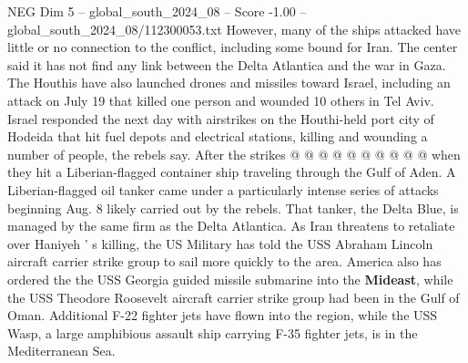 \begin{textsample}{NEG Dim 5 – global\_south\_2024\_08 – Score -1.00 – global\_south\_2024\_08/112300053.txt}
However, many of the ships attacked have little or no connection to the conflict, including some bound for Iran.
The center said it has not find any link between the Delta Atlantica and the war in Gaza.
The Houthis have also launched drones and missiles toward Israel, including an attack on July 19 that killed one person and wounded 10 others in Tel Aviv.
Israel responded the next day with airstrikes on the Houthi-held port city of Hodeida that hit fuel depots and electrical stations, killing and wounding a number of people, the rebels say.
After the strikes @ @ @ @ @ @ @ @ @ @ when they hit a Liberian-flagged container ship traveling through the Gulf of Aden.
A Liberian-flagged oil tanker came under a particularly intense series of attacks beginning Aug. 8 likely carried out by the rebels.
That tanker, the Delta Blue, is managed by the same firm as the Delta Atlantica.
As Iran threatens to retaliate over Haniyeh ' s killing, the US Military has told the USS Abraham Lincoln aircraft carrier strike group to sail more quickly to the area.
America also has ordered the the USS Georgia guided missile submarine into the \textbf{Mideast}, while the USS Theodore Roosevelt aircraft carrier strike group had been in the Gulf of Oman.
Additional F-22 fighter jets have flown into the region, while the USS Wasp, a large amphibious assault ship carrying F-35 fighter jets, is in the Mediterranean Sea.

\end{textsample}
